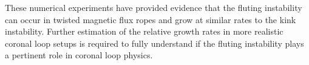 These numerical experiments have provided evidence that the fluting instability can occur in twisted magnetic flux ropes and grow at similar rates to the kink instability. Further estimation of the relative growth rates in more realistic coronal loop setups is required to fully understand if the fluting instability plays a pertinent role in coronal loop physics.
